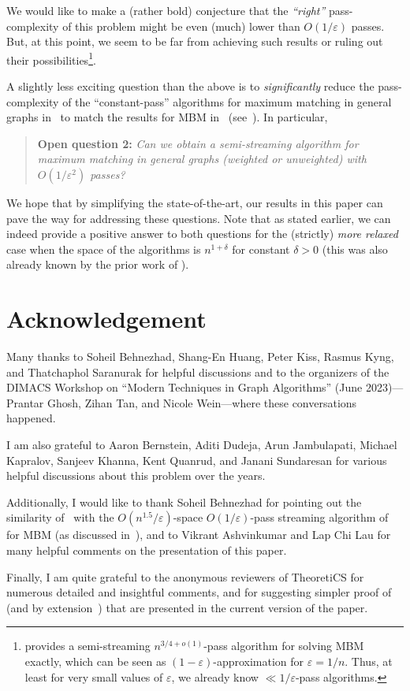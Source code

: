 \documentclass{theoretics}
\newcommand{\eps}{\varepsilon}
\begin{document}
We would like to make a (rather bold) conjecture that the \emph{``right''} pass-complexity of this problem might be even (much) lower than $O(1/\eps)$ passes. But, at this point, we seem to be 
far from achieving such results or ruling out their possibilities\footnote{\cite{AssadiJJST22} provides a semi-streaming $n^{3/4+o(1)}$-pass algorithm for solving MBM exactly, which can be seen as $(1-\eps)$-approximation for $\eps=1/n$. Thus, 
at least for  very small values of $\eps$, we already know $\ll 1/\eps$-pass algorithms.}.  

A slightly less exciting question than the above is to \emph{significantly} reduce the pass-complexity of the ``constant-pass'' algorithms for maximum matching in general graphs
in~\cite{FischerMU22,HuangS23} to match the results for MBM in~\cite{AssadiLT21} (see~).  
In particular,  
\begin{quote}
	\textbf{Open question 2:} \emph{Can we obtain a semi-streaming algorithm for maximum matching in general graphs (weighted or unweighted) with $O(1/\eps^2)$ passes?}
\end{quote}

We hope that by simplifying the state-of-the-art, our results in this paper can pave the way for addressing these questions. Note that as stated earlier, we can indeed provide a positive answer to both questions for the (strictly) \emph{more relaxed}
case when the space of the algorithms is  $n^{1+\delta}$ for  constant $\delta > 0$ (this was also already known by the prior work of \cite{AhnG15}). 



\section*{Acknowledgement} 

Many thanks to Soheil Behnezhad, Shang-En Huang, Peter Kiss, Rasmus Kyng, and Thatchaphol Saranurak for helpful discussions and to
the organizers of the DIMACS Workshop on ``Modern Techniques in Graph Algorithms'' (June 2023)---Prantar Ghosh, Zihan Tan, and Nicole Wein---where these conversations happened. 

I am also grateful to Aaron Bernstein, Aditi Dudeja, Arun Jambulapati, Michael Kapralov, Sanjeev Khanna, Kent Quanrud, and Janani Sundaresan for various helpful discussions about this problem over the years. 

Additionally, I would like to thank Soheil Behnezhad for pointing out the similarity of~ with the $O(n^{1.5}/\eps)$-space $O(1/\eps)$-pass streaming algorithm of~\cite{BehnezhadDETY17} for MBM (as discussed in~),
and to Vikrant Ashvinkumar and Lap Chi Lau for many helpful comments on the presentation of this paper. 
 
 Finally, I am quite grateful to the anonymous reviewers of TheoretiCS for numerous detailed and insightful comments, and for suggesting simpler proof of~ (and by extension~) that are 
 presented in the current version of the paper. 

%
%
\printbibliography
\end{document}
